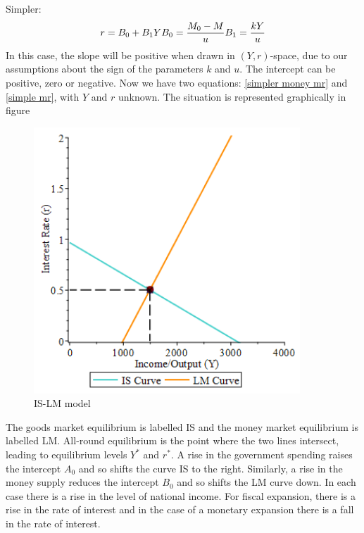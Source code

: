 \documentclass[a4paper,12pt]{report}
\begin{document}
Simpler:
\begin{equation}\label{simpler money mr}
 r=B_{0}+B_{1}Y\\
 B_{0}=\frac{M_{0}-M}{u} \\
 B_{1}=\frac{kY}{u}
\end{equation}
In this case, the slope will be positive when drawn in $(Y,r)$-space, due to our assumptions about the sign of the parameters $k$ and $u$. The intercept can be positive, zero or negative.
Now we have two equations: \eqref{simpler money mr} and \eqref{simple mr}, with $Y$ and $r$ unknown. The situation is represented graphically in figure
\begin{figure}[h]
\caption{IS-LM model\cite{shone}}
\centering
 \includegraphics[width=10cm]{IS-LM.png}
\end{figure}
The goods market equilibrium is labelled IS and the money market equilibrium is labelled LM. All-round equilibrium is the point where the two lines intersect, leading to equilibrium levels $Y^{*}$ and $r^{*}$. 
A rise in the government spending raises the intercept $A_{0}$ and so shifts the curve IS to the right. Similarly, a rise in the money supply reduces the intercept $B_{0}$ and so shifts the LM curve down. In each case there is a rise in the level of national income. For fiscal expansion, there is a rise in the rate of interest and in the case of a monetary expansion there is a fall in the rate of interest.
\end{document}

